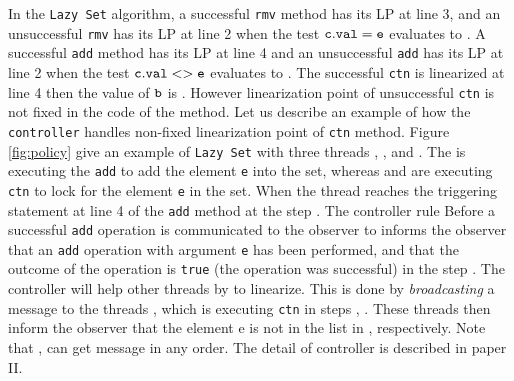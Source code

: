 %
In the {\tt Lazy Set} algorithm, a successful {\tt rmv} method has its LP at line 3, and an unsuccessful {\tt rmv} has its LP at line 2 when the test $\tt c.val = e$ evaluates to \false. A successful {\tt add} method has its LP at line 4 and an unsuccessful {\tt add} has its LP at line 2 when the test $\tt c.val <> e$ evaluates to \false\;. The successful {\tt ctn} is linearized at line 4 then the value of $\tt b$ is \true. However linearization point of unsuccessful {\tt ctn} is not fixed in the code of the method.  Let us describe an example of how the {\tt controller} handles non-fixed linearization point of {\tt ctn} method. Figure \ref{fig:policy} give an example of {\tt Lazy Set} with three threads \threada\;, \threadb\;, and \threadc. The \threada \; is executing the {\tt add} to add the element {\tt e} into the set, whereas \threadb\; and \threadc\; are executing {\tt ctn} to lock for the element {\tt e} in the set. When the thread \threada\; reaches the triggering statement at line 4 of the {\tt add} method at the step \;\stepa\;. The controller rule 
Before a successful {\tt add} operation is communicated to the observer 
to informs the observer that an {\tt add} operation 
with argument {\tt e} has been performed, and that the outcome
of the operation is {\tt true} (the operation was successful) in the step \stepf\;. The controller will help other threads
by to linearize. This is done by {\it broadcasting} a message to the threads \threadb, \threadc\; which is executing {\tt ctn} in steps \stepb, \stepc. These threads then inform the observer that the element e is not in the list in \stepc, \stepe\; respectively. Note that \threadb, \threadc\; can get message in any order. The detail of controller is described in paper II.


